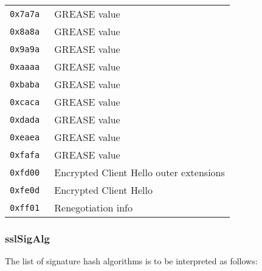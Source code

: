 \documentclass[documentation]{subfiles}
\begin{document}
\begin{minipage}{.48\textwidth}
\begin{longtable}{>{\tt}rl}
        0x7a7a & GREASE value\\
        0x8a8a & GREASE value\\
        0x9a9a & GREASE value\\
        0xaaaa & GREASE value\\
        0xbaba & GREASE value\\
        0xcaca & GREASE value\\
        0xdada & GREASE value\\
        0xeaea & GREASE value\\
        0xfafa & GREASE value\\
        0xfd00 & Encrypted Client Hello outer extensions\\
        0xfe0d & Encrypted Client Hello\\
        0xff01 & Renegotiation info\\
        \bottomrule
    \end{longtable}
\end{minipage}

\subsubsection{sslSigAlg}\label{sslSigAlg}
The list of signature hash algorithms is to be interpreted as follows:
\end{document}
